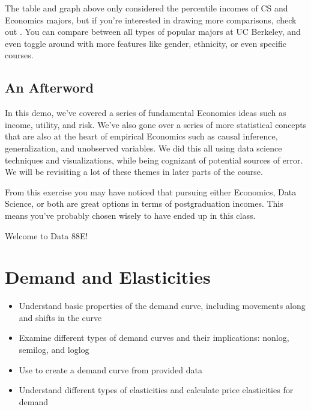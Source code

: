 \documentclass[letterpaper,10pt,english]{jupyterBook}
\begin{document}
\sphinxAtStartPar
The table and graph above only considered the percentile incomes of CS and Economics majors, but if you’re interested in drawing more comparisons, check out . You can compare between all types of popular majors at UC Berkeley, and even toggle around with more features like gender, ethnicity, or even specific courses.


\subsection{An Afterword}
\label{\detokenize{content/00-intro/index:an-afterword}}
\sphinxAtStartPar
In this demo, we’ve covered a series of fundamental Economics ideas such as income, utility, and risk. We’ve also gone over a series of more statistical concepts that are also at the heart of empirical Economics such as causal inference, generalization, and unobserved variables. We did this all using data science techniques and visualizations, while being cognizant of potential sources of error. We will be revisiting a lot of these themes in later parts of the course.

\sphinxAtStartPar
From this exercise you may have noticed that pursuing either Economics, Data Science, or both are great options in terms of post\sphinxhyphen{}graduation incomes. This means you’ve probably chosen wisely to have ended up in this class.

\sphinxAtStartPar
Welcome to Data 88E!


\section{Demand and Elasticities}
\label{\detokenize{content/01-demand/index:demand-and-elasticities}}\label{\detokenize{content/01-demand/index::doc}}
\sphinxAtStartPar
{}
\begin{itemize}
\item {} 
\sphinxAtStartPar
Understand basic properties of the demand curve, including movements along and shifts in the curve

\item {} 
\sphinxAtStartPar
Examine different types of demand curves and their implications: non\sphinxhyphen{}log, semi\sphinxhyphen{}log, and log\sphinxhyphen{}log

\item {} 
\sphinxAtStartPar
Use  to create a demand curve from provided data

\item {} 
\sphinxAtStartPar
Understand different types of elasticities and calculate price elasticities for demand

\end{itemize}
\end{document}
